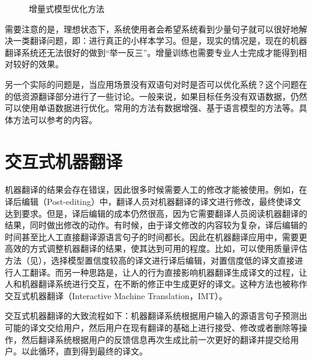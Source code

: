 \begin{figure}[htp]
\centering

\caption{增量式模型优化方法}
\label{fig:18-1}
\end{figure}

\parinterval 需要注意的是，理想状态下，系统使用者会希望系统看到少量句子就可以很好地解决一类翻译问题，即：进行真正的小样本学习。但是，现实的情况是，现在的机器翻译系统还无法很好的做到“举一反三”。增量训练也需要专业人士完成才能得到相对较好的效果。

\parinterval 另一个实际的问题是，当应用场景没有双语句对时是否可以优化系统？这个问题在{\chaptersixteen}的低资源翻译部分进行了一些讨论。一般来说，如果目标任务没有双语数据，仍然可以使用单语数据进行优化。常用的方法有数据增强、基于语言模型的方法等。具体方法可以参考{\chaptersixteen}的内容。


\section{交互式机器翻译}

\parinterval 机器翻译的结果会存在错误，因此很多时候需要人工的修改才能被使用。例如，在{\small\bfnew 译后编辑}（Post-editing）中，翻译人员对机器翻译的译文进行修改，最终使译文达到要求。但是，译后编辑的成本仍然很高，因为它需要翻译人员阅读机器翻译的结果，同时做出修改的动作。有时候，由于译文修改的内容较为复杂，译后编辑的时间甚至比人工直接翻译源语言句子的时间都长。因此在机器翻译应用中，需要更高效的方式调整机器翻译的结果，使其达到可用的程度。比如，可以使用质量评估方法（见{\chapterfour}），选择模型置信度较高的译文进行译后编辑，对置信度低的译文直接进行人工翻译。而另一种思路是，让人的行为直接影响机器翻译生成译文的过程，让人和机器翻译系统进行交互，在不断的修正中生成更好的译文。这种方法也被称作{\small\bfnew 交互式机器翻译}（Interactive Machine Translation，IMT）。

\parinterval 交互式机器翻译的大致流程如下：机器翻译系统根据用户输入的源语言句子预测出可能的译文交给用户，然后用户在现有翻译的基础上进行接受、修改或者删除等操作，然后翻译系统根据用户的反馈信息再次生成比前一次更好的翻译并提交给用户。以此循环，直到得到最终的译文。

